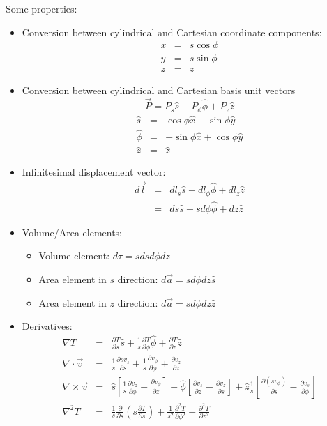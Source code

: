 \documentclass[12pt,a4paper,twoside]{article}
\begin{document}
	\noindent Some properties:
	\begin{itemize}
		\item Conversion between cylindrical and Cartesian coordinate components:
		\begin{eqnarray*}
			x &=& s\cos\phi\\
			y &=& s\sin\phi\\
			z &=& z
		\end{eqnarray*}
		\item Conversion between cylindrical and Cartesian basis unit vectors 
		\[\overrightarrow{P}=P_s\hat{s}+P_\phi\hat{\phi}+P_z\hat{z}\]
		\begin{eqnarray*}
			\hat{s} &=& \cos\phi\hat{x} + \sin\phi\hat{y}\\
			\hat{\phi} &=& -\sin\phi\hat{x} + \cos\phi\hat{y}\\
			\hat{z} &=& \hat{z}
		\end{eqnarray*}
		\item Infinitesimal displacement vector:
		\begin{eqnarray*}
			d\overrightarrow{l} &=& dl_s\hat{s}+dl_\phi\hat{\phi}+dl_z\hat{z}\\
			&=& ds\hat{s}+sd\phi\hat{\phi}+dz\hat{z}
		\end{eqnarray*}
		
		\item Volume/Area elements:
		\begin{itemize}
			\item Volume element: \(d\tau=sdsd\phi dz\)
			\item Area element in $s$ direction: \(d\overrightarrow{a}=sd\phi dz\hat{s}\)
			\item Area element in $z$ direction: \(d\overrightarrow{a}=sd\phi dz\hat{z}\)
		\end{itemize}
		\item Derivatives:
		\begin{eqnarray*}
			\nabla T &=& \frac{\partial T}{\partial s}\hat{s}+\frac{1}{s}\frac{\partial T}{\partial \phi}\hat{\phi}+\frac{\partial T}{\partial z}\hat{z}\\
			\nabla \cdot \overrightarrow{v} &=& \frac{1}{s}\frac{\partial sv_s}{\partial s} +\frac{1}{s}\frac{\partial v_\phi}{\partial \phi}+\frac{\partial v_z}{\partial z}\\
			\nabla \times \overrightarrow{v} &=& \hat{s}\left[\frac{1}{s}\frac{\partial v_z}{\partial \phi}-\frac{\partial v_\phi}{\partial z}\right]+\hat{\phi}\left[\frac{\partial v_s}{\partial z}-\frac{\partial v_z}{\partial s}\right]+\hat{z}\frac{1}{s}\left[\frac{\partial (sv_\phi)}{\partial s}-\frac{\partial v_s}{\partial \phi}\right]\\
			\nabla^2T &=& \frac{1}{s}\frac{\partial}{\partial s}\left(s\frac{\partial T}{\partial s}\right) + \frac{1}{s^2}\frac{\partial^2 T}{\partial\phi^2}+\frac{\partial^2T}{\partial z^2}
		\end{eqnarray*}
	\end{itemize}
	
\end{document}

